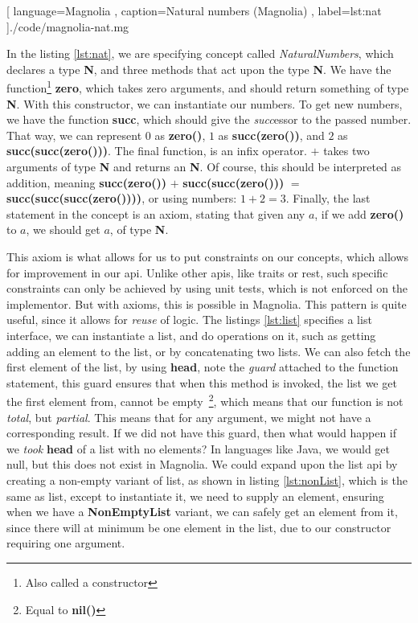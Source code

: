 \begin{center}
  
    [ language=Magnolia
    , caption={Natural numbers (Magnolia)}
    , label=lst:nat
    ]{./code/magnolia-nat.mg}
\end{center}

In the listing \ref{lst:nat}, we are specifying concept called
\textit{NaturalNumbers}, which declares a type \textbf{N}, and three methods
that act upon the type \textbf{N}. We have the function\footnote{Also called a constructor}
\textbf{zero}, which takes zero arguments, and should return something of type
\textbf{N}. With this constructor, we can instantiate our numbers. To get new
numbers, we have the function \textbf{succ}, which should give the
\textit{succ}essor to the passed number. That way, we can represent $0$ as
\textbf{zero()}, $1$ as \textbf{succ(zero())}, and $2$ as
\textbf{succ(succ(zero()))}. The final function, is an infix operator. $+$ takes
two arguments of type \textbf{N} and returns an \textbf{N}. Of course, this
should be interpreted as addition, meaning \textbf{succ(zero())} $+$
\textbf{succ(succ(zero()))} $=$ \textbf{succ(succ(succ(zero())))}, or using
numbers: $1 + 2 = 3$. Finally, the last statement in the concept is an axiom,
stating that given any $a$, if we add \textbf{zero()} to $a$, we should get $a$,
of type \textbf{N}.

This axiom is what allows for us to put constraints on our concepts, which
allows for improvement in our \gls*{api}. Unlike other \gls*{api}s, like traits or
\gls*{rest}, such specific constraints can only be achieved by using unit tests,
which is not enforced on the implementor. But with axioms, this is possible in
Magnolia. This pattern is quite useful, since it allows for \textit{reuse} of
logic. The listings \ref{lst:list} specifies a list interface, we can
instantiate a list, and do operations on it, such as getting adding an element to
the list, or by concatenating two lists. We can also fetch the first element of
the list, by using \textbf{head}, note the \textit{guard} attached to the
function statement, this guard ensures that when this method is invoked, the
list we get the first element from, cannot be empty~\footnote{Equal to \textbf{nil()}},
which means that our function is not \textit{total}, but \textit{partial}. This
means that for any argument, we might not have a corresponding result. If we did
not have this guard, then what would happen if we \textit{took} \textbf{head} of a list
with no elements? In languages like Java, we would get null, but this does not
exist in Magnolia. We could expand upon the list \gls*{api} by creating a
non-empty variant of list, as shown in listing \ref{lst:nonList}, which is the
same as list, except to instantiate it, we need to supply an element, ensuring
when we have a \textbf{NonEmptyList} variant, we can safely get an element from
it, since there will at minimum be one element in the list, due to our
constructor requiring one argument.

